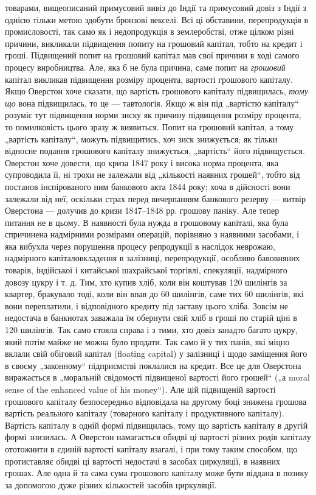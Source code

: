 \parcont{}  %
товарами, вищеописаний примусовий вивіз до Індії та примусовий
довіз з Індії з однією тільки метою здобути бронзові векселі.
Всі ці обставини, перепродукція в промисловості, так само як
і недопродукція в землеробстві, отже цілком різні причини, викликали підвищення попиту на грошовий
капітал, тобто на кредит і гроші. Підвищений попит на грошовий капітал мав свої
причини в ході самого процесу виробництва. Але, яка б не була
причина, саме попит на \emph{грошовий} капітал викликав підвищення
розміру процента, вартості грошового капіталу. Якщо Оверстон хоче сказати, що вартість грошового
капіталу підвищилась, \emph{тому що} вона підвищилась, то це — тавтологія. Якщо ж
він під „вартістю капіталу“ розуміє тут підвищення норми зиску
як причину підвищення розміру процента, то помилковість цього
зразу ж виявиться. Попит на грошовий капітал, а тому „вартість капіталу“, можуть підвищитись, хоч
зиск знижується; як
тільки відносне подання грошового капіталу знижується, „вартість“ його підвищується. Оверстон хоче
довести, що криза 1847 року і висока норма процента, яка супроводила її, ні трохи
не залежали від „кількості наявних грошей“, тобто від постанов інспірованого ним банкового акта 1844
року; хоча в дійсності вони залежали від неї, оскільки страх перед вичерпанням
банкового резерву — витвір Оверстона — долучив до кризи 1847--1848 рр. грошову паніку. Але тепер
питання не в цьому.
В наявності була нужда в грошовому капіталі, яка була спричинена надмірними розмірами операцій,
порівняно з наявними засобами, і яка вибухла через порушення процесу репродукції в наслідок
неврожаю, надмірного капіталовкладення в залізниці, перепродукції, особливо бавовняних товарів,
індійської і китайської
шахрайської торгівлі, спекуляції, надмірного довозу цукру і т. д.
Тим, хто купив хліб, коли він коштував 120 шилінгів за квартер, бракувало тоді, коли він впав до 60
шилінгів, саме тих
60 шилінгів, які вони переплатили, і відповідного кредиту під
заставу цього хліба. Зовсім не недостача в банкнотах заважала
їм обернути свій хліб в гроші по старій ціні в 120 шилінгів.
Так само стояла справа і з тими, хто довіз занадто багато
цукру, який потім майже не можна було продати. Так само й
у тих панів, які міцно вклали свій обіговий капітал (floating capital)
у залізниці і щодо заміщення його в своєму „законному“ підприємстві поклалися на кредит. Все це для
Оверстона виражається в „моральній свідомості підвищеної вартості його грошей“ („а moral sense of
the enhanced value of his money“). Але цій
підвищеній вартості грошового капіталу безпосередньо відповідала на другому боці знижена грошова
вартість реального капіталу
(товарного капіталу і продуктивного капіталу). Вартість капіталу
в одній формі підвищилась, тому що вартість капіталу в другій
формі знизилась. А Оверстон намагається обидві ці вартості різних
родів капіталу ототожнити в єдиній вартості капіталу взагалі, і
при тому таким способом, що протиставляє обидві ці вартості недостачі
в засобах циркуляції, в наявних грошах. Але одна й та сама
сума грошового капіталу може бути віддана в позику за допомогою дуже різних кількостей засобів
циркуляції.

